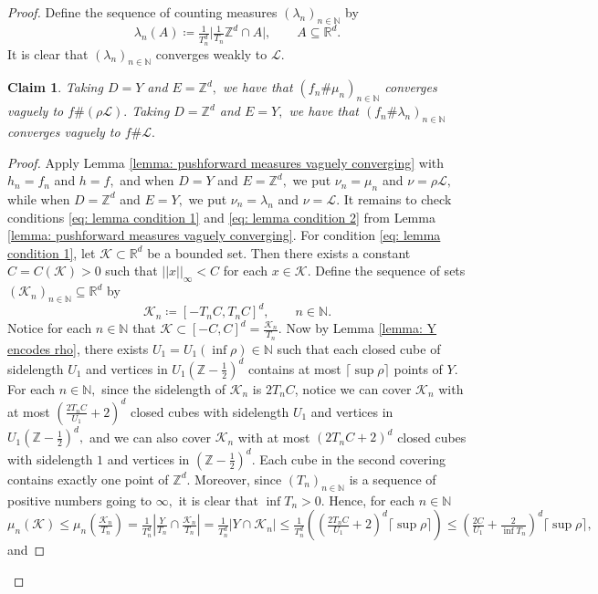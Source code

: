 \documentclass{article}
\newtheorem{claim}[define]{Claim}
\newcommand{\R}{\mathbb{R}}
\newcommand{\Z}{\mathbb{Z}}
\newcommand{\N}{\mathbb{N}}
\newcommand{\leb}{\mc{L}}
\newcommand{\mc}[1]{\mathcal{#1}}
\begin{document}
\begin{proof}
Define the sequence of counting measures $(\lambda_n)_{n \in \N}$ by
$$\lambda_n(A) \coloneqq \tfrac{1}{T_n^d} \bigg|\tfrac{1}{T_n}\Z^d \cap A\bigg|, \qquad A \subseteq \R^d.$$ It is clear that $(\lambda_n)_{n \in \N}$ converges weakly to $\leb.$
    \begin{claim} Taking $D = Y$ and $E = \Z^d,$ we have that
         $(f_n\#\mu_n)_{n \in \N}$ converges vaguely to $f \# (\rho \leb).$ Taking $D = \Z^d$ and $E = Y,$ we have that $(f_n\#\lambda_n)_{n \in \N}$ converges vaguely to $f \# \leb.$
    \end{claim} 
\begin{proof} Apply Lemma \ref{lemma: pushforward measures vaguely converging} with $h_n = f_n$ and $h = f,$ and when $D = Y$ and $E = \Z^d,$ we put $\nu_n = \mu_n$ and $\nu = \rho\leb,$ while when $D = \Z^d$ and $E = Y,$ we put $\nu_n = \lambda_n$ and $\nu = \leb.$ It remains to check conditions \eqref{eq: lemma condition 1} and \eqref{eq: lemma condition 2} from Lemma \ref{lemma: pushforward measures vaguely converging}. For condition \eqref{eq: lemma condition 1}, let $\mathcal{K}\subset \R^d$ be a bounded set. Then there exists a constant $C=C(\mathcal{K}) >0$ such that $||x||_\infty <C$ for each $x \in \mathcal{K}.$ 
Define the sequence of sets $(\mathcal{K}_n)_{n \in \N} \subseteq \R^d$ by
\begin{equation*}
    \mathcal{K}_n \coloneqq [-T_nC,T_nC]^d, \qquad n \in \N.
\end{equation*} 
Notice for each $n \in \N$ that $\mathcal{K} \subset [-C,C]^d = \frac{\mathcal{K}_n}{T_n}.$
Now by Lemma \ref{lemma: Y encodes rho}, there exists $U_1 = U_1(\inf \rho) \in \N$ such that each closed cube of sidelength $U_1$ and vertices in $U_1(\Z-\frac{1}{2})^d$ contains at most $\lceil \sup \rho \rceil$ points of $Y.$ 
For each $n \in \N,$ since the sidelength of $\mathcal{K}_n$ is $2T_nC$, notice we can cover $\mathcal{K}_n$ with at most $(\frac{2T_nC}{U_1}+2)^d$ closed cubes with sidelength $U_1$ and vertices in $U_1(\Z-\frac{1}{2})^d,$ 
and we can also cover $\mathcal{K}_n$ with at most $(2T_nC +2)^d$ closed cubes with sidelength $1$ and vertices in $(\Z-\frac{1}{2})^d.$ Each cube in the second covering contains exactly one point of $\Z^d.$ Moreover, since $(T_n)_{n \in \N}$ is a sequence of positive numbers going to $\infty,$ it is clear that $\inf T_n >0.$
Hence, for each $n \in \N$ 
$$\mu_n(\mathcal{K}) \leq \mu_n\left(\tfrac{\mathcal{K}_n}{T_n}\right)= \tfrac{1}{T_n^d}|\tfrac{Y}{T_n} \cap \tfrac{\mathcal{K}_n}{T_n}| =\tfrac{1}{T_n^d}|Y \cap \mathcal{K}_n| \leq \tfrac{1}{T_n^d}\left(\left(\tfrac{2T_nC}{U_1}+2\right)^d\lceil\sup \rho\rceil \right) \leq \left(\tfrac{2C}{U_1}+\tfrac{2}{\inf T_n}\right)^d  \lceil \sup\rho\rceil ,$$ and

\end{proof}
\end{proof}
\end{document}
